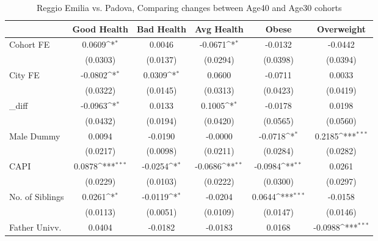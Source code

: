 \begin{table}[htbp]\centering
\def\sym#1{\ifmmode^{#1}\else\(^{#1}\)\fi}
\caption{Reggio Emilia vs. Padova, Comparing changes between Age40 and Age30 cohorts}
\begin{tabular}{l*{5}{c}}
\toprule
            &\multicolumn{1}{c}{Good Health}&\multicolumn{1}{c}{Bad Health}&\multicolumn{1}{c}{Avg Health}&\multicolumn{1}{c}{Obese}&\multicolumn{1}{c}{Overweight}\\
\midrule
Cohort FE   &      0.0609\sym{*}  &      0.0046         &     -0.0671\sym{*}  &     -0.0132         &     -0.0442         \\
            &    (0.0303)         &    (0.0137)         &    (0.0294)         &    (0.0398)         &    (0.0394)         \\
\addlinespace
City FE     &     -0.0802\sym{*}  &      0.0309\sym{*}  &      0.0600         &     -0.0711         &      0.0033         \\
            &    (0.0322)         &    (0.0145)         &    (0.0313)         &    (0.0423)         &    (0.0419)         \\
\addlinespace
\_diff       &     -0.0963\sym{*}  &      0.0133         &      0.1005\sym{*}  &     -0.0178         &      0.0198         \\
            &    (0.0432)         &    (0.0194)         &    (0.0420)         &    (0.0565)         &    (0.0560)         \\
\addlinespace
Male Dummy  &      0.0094         &     -0.0190         &     -0.0000         &     -0.0718\sym{*}  &      0.2185\sym{***}\\
            &    (0.0217)         &    (0.0098)         &    (0.0211)         &    (0.0284)         &    (0.0282)         \\
\addlinespace
CAPI        &      0.0878\sym{***}&     -0.0254\sym{*}  &     -0.0686\sym{**} &     -0.0984\sym{**} &      0.0261         \\
            &    (0.0229)         &    (0.0103)         &    (0.0222)         &    (0.0300)         &    (0.0297)         \\
\addlinespace
No. of Siblings&      0.0261\sym{*}  &     -0.0119\sym{*}  &     -0.0204         &      0.0644\sym{***}&     -0.0158         \\
            &    (0.0113)         &    (0.0051)         &    (0.0109)         &    (0.0147)         &    (0.0146)         \\
\addlinespace
Father Univv.&      0.0404         &     -0.0182         &     -0.0183         &      0.0168         &     -0.0988\sym{***}\\

\end{tabular}
\end{table}
